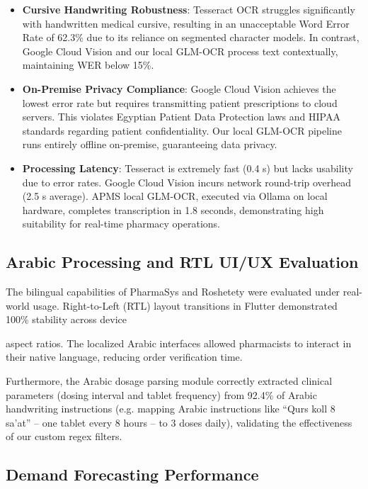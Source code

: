 \documentclass[12pt,a4paper,oneside]{report}
\begin{document}
\begin{itemize}
\item
  \textbf{Cursive Handwriting Robustness}: Tesseract OCR struggles
  significantly with handwritten medical cursive, resulting in an
  unacceptable Word Error Rate of 62.3\% due to its reliance on
  segmented character models. In contrast, Google Cloud Vision and our
  local GLM-OCR process text contextually, maintaining WER below 15\%.
\item
  \textbf{On-Premise Privacy Compliance}: Google Cloud Vision achieves
  the lowest error rate but requires transmitting patient prescriptions
  to cloud servers. This violates Egyptian Patient Data Protection laws
  and HIPAA standards regarding patient confidentiality. Our local GLM-OCR
  pipeline runs entirely offline on-premise, guaranteeing data
  privacy.
\item
  \textbf{Processing Latency}: Tesseract is extremely fast (0.4 s) but
  lacks usability due to error rates. Google Cloud Vision incurs network
  round-trip overhead (2.5 s average). APMS local GLM-OCR, executed
  via Ollama on local hardware, completes transcription in 1.8 seconds,
  demonstrating high suitability for real-time pharmacy operations.
\end{itemize}

\subsection{Arabic Processing and RTL UI/UX
Evaluation}\label{arabic-processing-and-rtl-uiux-evaluation}

The bilingual capabilities of PharmaSys and Roshetety were evaluated
under real-world usage. Right-to-Left (RTL) layout transitions in
Flutter demonstrated 100\% stability across device

aspect ratios. The localized Arabic interfaces allowed pharmacists to
interact in their native language, reducing order verification time.

Furthermore, the Arabic dosage parsing module correctly extracted
clinical parameters (dosing interval and tablet frequency) from 92.4\%
of Arabic handwriting instructions (e.g. mapping Arabic instructions
like ``Qurs koll 8 sa'at'' -- one tablet every 8 hours -- to 3 doses
daily), validating the effectiveness of our custom regex filters.

\subsection{Demand Forecasting
Performance}\label{demand-forecasting-performance}
\end{document}
